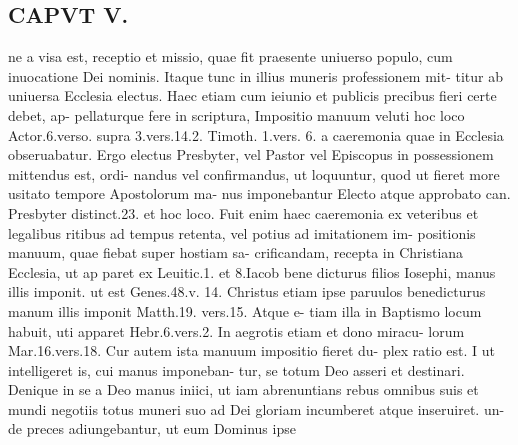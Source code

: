 \documentclass{article}
\begin{document}
\begin{pages}
\section*{CAPVT  V. }
\marginpar{[ p.359 ]}ne a visa est, receptio et missio, quae fit praesente uniuerso populo, cum inuocatione Dei nominis. Itaque tunc in illius muneris professionem mit- titur ab uniuersa Ecclesia electus. Haec etiam cum ieiunio et publicis precibus fieri certe debet, ap- pellaturque fere in scriptura, Impositio manuum veluti hoc loco Actor.6.verso. supra 3.vers.14.2. Timoth. 1.vers. 6. a caeremonia quae in Ecclesia obseruabatur. Ergo electus Presbyter, vel Pastor vel Episcopus in possessionem mittendus est, ordi- nandus vel confirmandus, ut loquuntur, quod ut fieret more usitato tempore Apostolorum ma- nus imponebantur Electo atque approbato can. Presbyter distinct.23. et hoc loco. Fuit enim haec caeremonia ex veteribus et legalibus ritibus ad tempus retenta, vel potius ad imitationem im- positionis manuum, quae fiebat super hostiam sa- crificandam, recepta in Christiana Ecclesia, ut ap paret ex Leuitic.1. et 8.Iacob bene dicturus filios Iosephi, manus illis imponit. ut est Genes.48.v. 14. Christus etiam ipse paruulos benedicturus manum illis imponit Matth.19. vers.15. Atque e- tiam illa in Baptismo locum habuit, uti apparet Hebr.6.vers.2. In aegrotis etiam et dono miracu- lorum Mar.16.vers.18. Cur autem ista manuum impositio fieret du- plex ratio est. I ut intelligeret is, cui manus imponeban- tur, se totum Deo asseri et destinari. Denique in se a Deo manus iniici, ut iam abrenuntians rebus omnibus suis et mundi negotiis totus muneri suo ad Dei gloriam incumberet atque inseruiret. un- de preces adiungebantur, ut eum Dominus ipse 

\end{pages}
\end{document}
